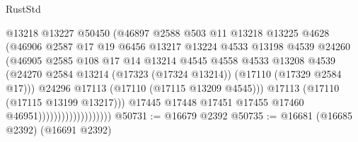 \begin{lexlean}{RustStd}
\begin{coremodule}
                                        @13218
                                        @13227
                                        @50450
                                        (@46897
                                          @2588
                                          @503
                                          @11
                                          @13218
                                          @13225
                                          @4628
                                          (@46906
                                            @2587
                                            @17
                                            @19
                                            @6456
                                            @13217
                                            @13224
                                            @4533
                                            @13198
                                            @4539
                                            @24260
                                            (@46905
                                              @2585
                                              @108
                                              @17
                                              @14
                                              @13214
                                              @4545
                                              @4558
                                              @4533
                                              @13208
                                              @4539
                                              (@24270
                                                @2584
                                                @13214
                                                (@17323 (@17324 @13214))
                                                (@17110 (@17329 @2584 @17)))
                                              @24296
                                              @17113
                                              (@17110 (@17115 @13209 @4545)))
                                            @17113
                                            (@17110 (@17115 @13199 @13217)))
                                          @17445
                                          @17448
                                          @17451
                                          @17455
                                          @17460
                                          @46951)))))))))))))))))))
@50731 := @16679 @2392
@50735 := @16681 (@16685 @2392) (@16691 @2392)

\end{coremodule}
\end{lexlean}
